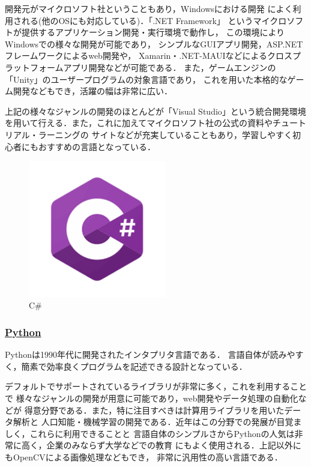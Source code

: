 \documentclass[autodetect-engine,dvi=dvipdfmx,ja=standard,a4j]{bxjsarticle}
\begin{document}
開発元がマイクロソフト社ということもあり，Windowsにおける開発
によく利用される(他のOSにも対応している)．「.NET Framework」
というマイクロソフトが提供するアプリケーション開発・実行環境で動作し，
この環境によりWindowsでの様々な開発が可能であり，
シンプルなGUIアプリ開発，ASP.NETフレームワークによるweb開発や，
Xamarin・.NET-MAUIなどによるクロスプラットフォームアプリ開発などが可能である．
また，ゲームエンジンの「Unity」のユーザープログラムの対象言語であり，
これを用いた本格的なゲーム開発などもでき，活躍の幅は非常に広い．

上記の様々なジャンルの開発のほとんどが「Visual Studio」という統合開発環境
を用いて行える．また，これに加えてマイクロソフト社の公式の資料やチュートリアル・ラーニングの
サイトなどが充実していることもあり，学習しやすく初心者にもおすすめの言語となっている．

\begin{figure}[H]
    \centering
    \includegraphics[width=60mm]{image/C-Sharp.png}
    \caption*{C\#}
    \label{fig:CS}
\end{figure}

\subsubsection*{\underline{\textbf{Python}}}
Pythonは1990年代に開発されたインタプリタ言語である．
言語自体が読みやすく，簡素で効率良くプログラムを記述できる設計となっている．

デフォルトでサポートされているライブラリが非常に多く，これを利用することで
様々なジャンルの開発が用意に可能であり，web開発やデータ処理の自動化などが
得意分野である．また，特に注目すべきは計算用ライブラリを用いたデータ解析と
人口知能・機械学習の開発である．近年はこの分野での発展が目覚ましく，これらに利用できることと
言語自体のシンプルさからPythonの人気は非常に高く，企業のみならず大学などでの教育
にもよく使用される．上記以外にもOpenCVによる画像処理などもでき，
非常に汎用性の高い言語である．
\end{document}

